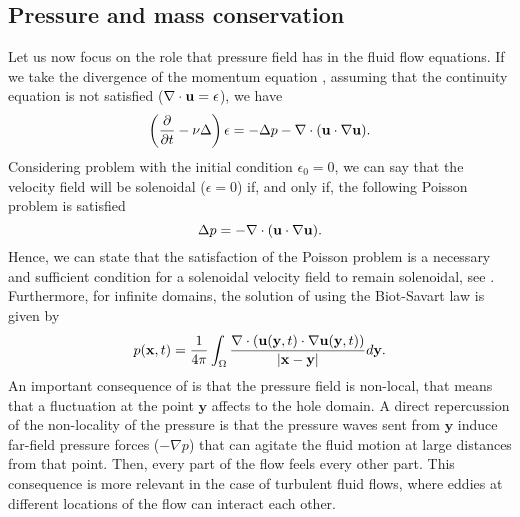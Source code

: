 \subsection{Pressure and mass conservation}
\label{subsec-pressure_mass_conservation}
Let us now focus on the role that pressure field has in the fluid flow equations. If we take the divergence of the momentum equation , assuming that the continuity equation  is not satisfied ($\nabla\cdot{\bf u}=\epsilon$), we have
\begin{equation}
\label{eq-NS_div_momentum}
\left(\frac{\partial}{\partial t}-\nu\Delta\right)\epsilon=-\Delta p-\nabla\cdot({\bf u}\cdot\nabla{\bf u}).
\end{equation}
Considering problem  with the initial condition $\epsilon_0=0$, we can say that the velocity field will be solenoidal ($\epsilon=0$) if, and only if, the following Poisson problem is satisfied
\begin{equation}
\label{eq-NS_poisson}
\Delta p=-\nabla\cdot({\bf u}\cdot\nabla{\bf u}).
\end{equation}
Hence, we can state that the satisfaction of the Poisson problem  is a necessary and sufficient condition for a solenoidal velocity field to remain solenoidal, see \cite{pope}. Furthermore, for infinite domains, the solution of  using the Biot-Savart law is given by 
\begin{equation}
\label{eq-NS_poisson_solution}
p({\bf x},t)=\frac{1}{4\pi}\int_\Omega\frac{\nabla\cdot({\bf u}(\mathbf{y},t)\cdot\nabla{\bf u}(\mathbf{y},t))}{|{\bf x}-\mathbf{y}|}d\mathbf{y}.
\end{equation}
An important consequence of  is that the pressure field is non-local, that means that a fluctuation at the point $\mathbf{y}$ affects to the hole domain. A direct repercussion of the non-locality of the pressure is that the pressure waves sent from $\mathbf{y}$ induce far-field pressure forces ($-\nabla p$) that can agitate the fluid motion at large distances from that point. Then, every part of the flow feels every other part. This consequence is more relevant in the case of turbulent fluid flows, where eddies at different locations of the flow can interact each other. 

